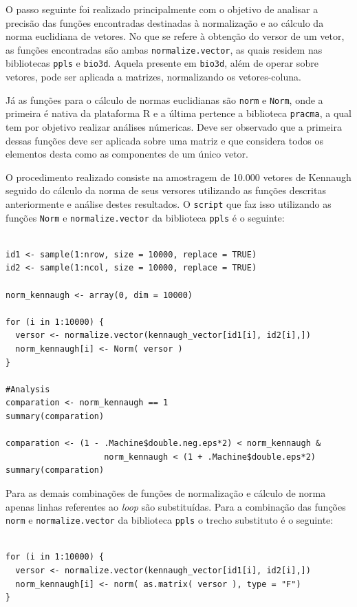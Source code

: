 \documentclass[12pt]{article}
\begin{document}
O passo seguinte foi realizado principalmente com o objetivo de analisar a precisão das funções encontradas destinadas à normalização e ao cálculo da norma euclidiana de vetores. No que se refere à obtenção do versor de um vetor, as funções encontradas são ambas \texttt{normalize.vector}, as quais residem nas bibliotecas \texttt{ppls} e \texttt{bio3d}. Aquela presente em \texttt{bio3d}, além de operar sobre vetores, pode ser aplicada a matrizes, normalizando os vetores-coluna.

Já as funções para o cálculo de normas euclidianas são \texttt{norm} e \texttt{Norm}, onde a primeira é nativa da plataforma R e a última pertence a biblioteca \texttt{pracma}, a qual tem por objetivo realizar análises númericas. Deve ser observado que a primeira dessas funções deve ser aplicada sobre uma matriz e que considera todos os elementos desta como as componentes de um único vetor.

O procedimento realizado consiste na amostragem de 10.000 vetores de Kennaugh seguido do cálculo da norma de seus versores utilizando as funções descritas anteriormente e análise destes resultados. O \texttt{script} que faz isso utilizando as funções \texttt{Norm} e \texttt{normalize.vector} da biblioteca \texttt{ppls} é o seguinte:

\begin{verbatim}

id1 <- sample(1:nrow, size = 10000, replace = TRUE)
id2 <- sample(1:ncol, size = 10000, replace = TRUE)

norm_kennaugh <- array(0, dim = 10000)

for (i in 1:10000) {
  versor <- normalize.vector(kennaugh_vector[id1[i], id2[i],])
  norm_kennaugh[i] <- Norm( versor )
}

#Analysis
comparation <- norm_kennaugh == 1
summary(comparation)

comparation <- (1 - .Machine$double.neg.eps*2) < norm_kennaugh &
                    norm_kennaugh < (1 + .Machine$double.eps*2)
summary(comparation)

\end{verbatim}

Para as demais combinações de funções de normalização e cálculo de norma apenas linhas referentes ao \textit{loop} são substituídas. Para a combinação das funções \texttt{norm} e \texttt{normalize.vector} da biblioteca \texttt{ppls} o trecho substituto é o seguinte:

\begin{verbatim}
    
for (i in 1:10000) {
  versor <- normalize.vector(kennaugh_vector[id1[i], id2[i],])
  norm_kennaugh[i] <- norm( as.matrix( versor ), type = "F")
}
    
\end{verbatim}
\end{document}
